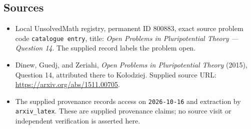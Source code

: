 \documentclass[11pt]{article}
\begin{document}
\subsection{Sources}
\begin{itemize}
\item Local UnsolvedMath registry, permanent ID \(800883\), exact source problem code \texttt{catalogue entry}, title: \emph{Open Problems in Pluripotential Theory --- Question 14}. The supplied record labels the problem open.
\item Dinew, Guedj, and Zeriahi, \emph{Open Problems in Pluripotential Theory} (2015), Question 14, attributed there to Ko\l{}odziej. Supplied source URL: \url{https://arxiv.org/abs/1511.00705}.
\item The supplied provenance records access on \texttt{2026-10-16} and extraction by \texttt{arxiv\_latex}. These are supplied provenance claims; no source visit or independent verification is asserted here.
\end{itemize}
\end{document}
